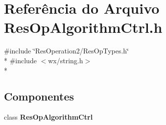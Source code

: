 \section{Referência do Arquivo Res\+Op\+Algorithm\+Ctrl.\+h}
\label{_res_op_algorithm_ctrl_8h}
{\ttfamily \#include \char`\"{}Res\+Operation2/\+Res\+Op\+Types.\+h\char`\"{}}\\*
{\ttfamily \#include $<$wx/string.\+h$>$}\\*
\subsection*{Componentes}
\begin{DoxyCompactItemize}
\item 
class {\bf Res\+Op\+Algorithm\+Ctrl}
\end{DoxyCompactItemize}
